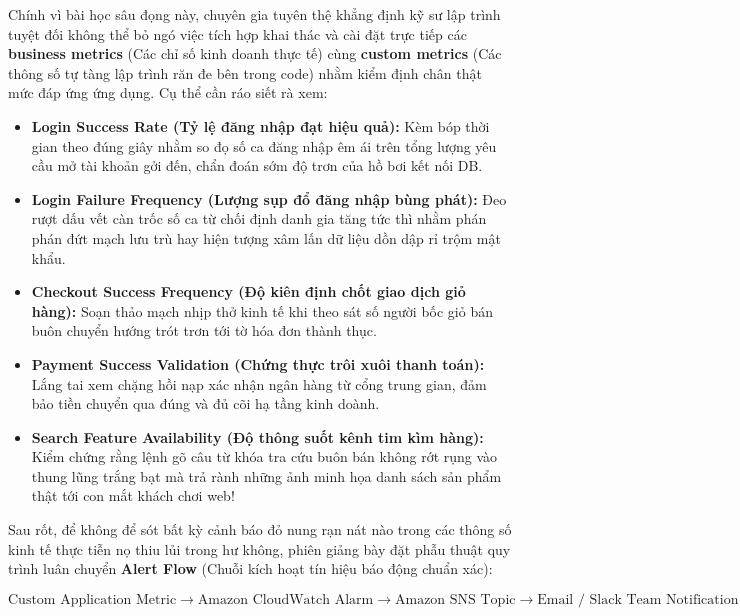 Chính vì bài học sâu đọng này, chuyên gia tuyên thệ khẳng định kỹ sư lập
trình tuyệt đối không thể bỏ ngó việc tích hợp khai thác và cài đặt trực
tiếp các \textbf{business metrics} (Các chỉ số kinh doanh thực tế) cùng
\textbf{custom metrics} (Các thông số tự tàng lập trình răn đe bên trong
code) nhằm kiểm định chân thật mức đáp ứng ứng dụng. Cụ thể cần ráo siết
rà xem:

\begin{itemize}
\tightlist
\item
  \textbf{Login Success Rate (Tỷ lệ đăng nhập đạt hiệu quả):} Kèm bóp
  thời gian theo đúng giây nhằm so đọ số ca đăng nhập êm ái trên tổng
  lượng yêu cầu mở tài khoản gởi đến, chẩn đoán sớm độ trơn của hồ bơi
  kết nối DB.
\item
  \textbf{Login Failure Frequency (Lượng sụp đổ đăng nhập bùng phát):}
  Đeo rượt dấu vết càn trốc số ca từ chối định danh gia tăng tức thì
  nhằm phán phán đứt mạch lưu trù hay hiện tượng xâm lấn dữ liệu dồn dập
  rỉ trộm mật khẩu.
\item
  \textbf{Checkout Success Frequency (Độ kiên định chốt giao dịch giỏ
  hàng):} Soạn thảo mạch nhịp thở kinh tế khi theo sát số người bốc giỏ
  bán buôn chuyển hướng trót trơn tới tờ hóa đơn thành thục.
\item
  \textbf{Payment Success Validation (Chứng thực trôi xuôi thanh toán):}
  Lắng tai xem chặng hồi nạp xác nhận ngân hàng từ cổng trung gian, đảm
  bảo tiền chuyển qua đúng và đủ cõi hạ tầng kinh doành.
\item
  \textbf{Search Feature Availability (Độ thông suốt kênh tim kìm
  hàng):} Kiểm chứng rằng lệnh gõ câu từ khóa tra cứu buôn bán không rớt
  rụng vào thung lũng trắng bạt mà trả rành những ảnh minh họa danh sách
  sản phẩm thật tới con mắt khách chơi web!
\end{itemize}

Sau rốt, để không để sót bất kỳ cảnh báo đỏ nung rạn nát nào trong các
thông số kinh tế thực tiễn nọ thiu lủi trong hư không, phiên giảng bày
đặt phẫu thuật quy trình luân chuyển \textbf{Alert Flow} (Chuỗi kích
hoạt tín hiệu báo động chuẩn xác):

\[\text{Custom Application Metric} \longrightarrow \text{Amazon CloudWatch Alarm} \longrightarrow \text{Amazon SNS Topic} \longrightarrow \text{Email / Slack Team Notification}\]


